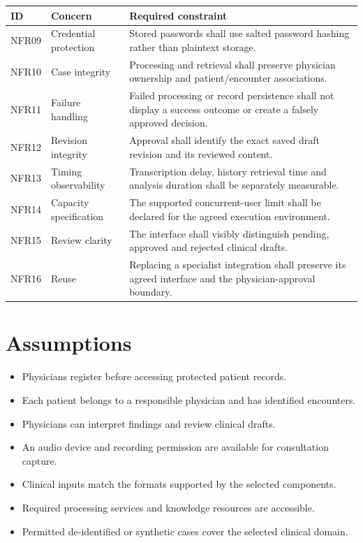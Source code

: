 \begin{reporttable}
\centering
\small
\caption{Non-functional requirements for access, persistence, performance and decision integrity.}
\label{tab:kashaf:nfr-integrity}
\begin{tabular}{|p{}|p{}|p{}|}
\hline
ID & Concern & Required constraint \\ \hline
NFR09 & Credential protection & Stored passwords shall use salted password hashing rather than plaintext storage. \\ \hline
NFR10 & Case integrity & Processing and retrieval shall preserve physician ownership and patient/encounter associations. \\ \hline
NFR11 & Failure handling & Failed processing or record persistence shall not display a success outcome or create a falsely approved decision. \\ \hline
NFR12 & Revision integrity & Approval shall identify the exact saved draft revision and its reviewed content. \\ \hline
NFR13 & Timing observability & Transcription delay, history retrieval time and analysis duration shall be separately measurable. \\ \hline
NFR14 & Capacity specification & The supported concurrent-user limit shall be declared for the agreed execution environment. \\ \hline
NFR15 & Review clarity & The interface shall visibly distinguish pending, approved and rejected clinical drafts. \\ \hline
NFR16 & Reuse & Replacing a specialist integration shall preserve its agreed interface and the physician-approval boundary. \\ \hline
\end{tabular}
\end{reporttable}


\section{Assumptions}

\begin{itemize}
\item Physicians register before accessing protected patient records.
\item Each patient belongs to a responsible physician and has identified encounters.
\item Physicians can interpret findings and review clinical drafts.
\item An audio device and recording permission are available for consultation capture.
\item Clinical inputs match the formats supported by the selected components.
\item Required processing services and knowledge resources are accessible.
\item Permitted de-identified or synthetic cases cover the selected clinical domain.
\end{itemize}

